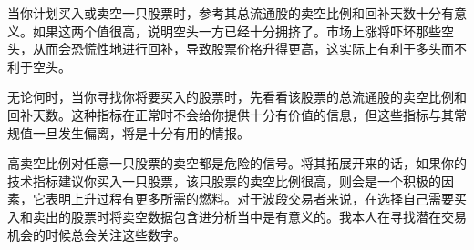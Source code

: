 当你计划买入或卖空一只股票时，参考其总流通股的卖空比例和回补天数十分有意义。如果这两个值很高，说明空头一方已经十分拥挤了。市场上涨将吓坏那些空头，从而会恐慌性地进行回补，导致股票价格升得更高，这实际上有利于多头而不利于空头。

无论何时，当你寻找你将要买入的股票时，先看看该股票的总流通股的卖空比例和回补天数。这种指标在正常时不会给你提供十分有价值的信息，但这些指标与其常规值一旦发生偏离，将是十分有用的情报。

高卖空比例对任意一只股票的卖空都是危险的信号。将其拓展开来的话，如果你的技术指标建议你买入一只股票，该只股票的卖空比例很高，则会是一个积极的因素，它表明上升过程有更多所需的燃料。对于波段交易者来说，在选择自己需要买入和卖出的股票时将卖空数据包含进分析当中是有意义的。我本人在寻找潜在交易机会的时候总会关注这些数字。